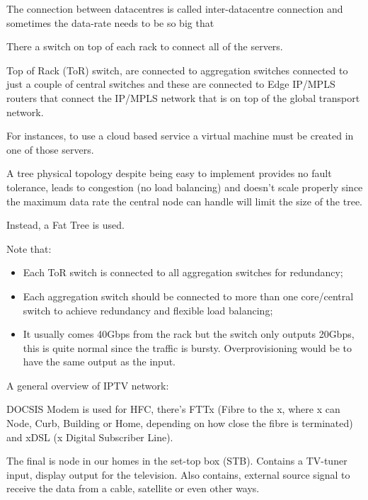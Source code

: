 The connection between datacentres is called inter-datacentre connection and sometimes the data-rate needs to be so big that 


There a switch on top of each rack to connect all of the servers. 


Top of Rack (ToR) switch, are connected to aggregation switches connected to just a couple of central switches and these are connected to Edge IP/MPLS routers that connect the IP/MPLS network that is on top of the global transport network.


For instances, to use a cloud based service a virtual machine must be created in one of those servers.


A tree physical topology despite being easy to implement provides no fault tolerance, leads to congestion (no load balancing) and doesn't scale properly since the maximum data rate the central node can handle will limit the size of the tree.



Instead, a Fat Tree is used.

Note that:
\begin{itemize}
    \item Each ToR switch is connected to all aggregation switches for redundancy;
    \item Each aggregation switch should be connected to more than one core/central switch to achieve redundancy and flexible load balancing;
    \item It usually comes 40Gbps from the rack but the switch only outputs 20Gbps, this is quite normal since the traffic is bursty. Overprovisioning would be to have the same output as the input. 
\end{itemize}




A general overview of IPTV network:






DOCSIS Modem is used for HFC, there's FTTx (Fibre to the x, where x can Node, Curb, Building or Home, depending on how close the fibre is terminated) and xDSL (x Digital Subscriber Line).




The final is node in our homes in the set-top box (STB). Contains a TV-tuner input, display output for the television. Also contains, external source signal to receive the data from a cable, satellite or even other ways.




